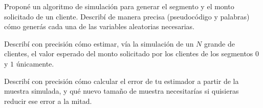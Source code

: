 \documentclass[11pt]{article}
\begin{document}
\medskip
{} Proponé un algoritmo de simulación para generar el segmento y el monto solicitado de un cliente. Describí de manera precisa (pseudocódigo y palabras) cómo generás cada una de las variables aleatorias necesarias.

\espacio{6cm}

 Describí con precisión cómo estimar, vía la simulación de un $N$ grande de clientes, el valor esperado del monto solicitado por los clientes de los segmentos $0$ y $1$ únicamente.

\espacio{4.5cm}

 Describí con precisión cómo calcular el error de tu estimador a partir de la muestra simulada, y qué nuevo tamaño de muestra necesitarías si quisieras reducir ese error a la mitad.

\espacio{4cm}
\end{document}
